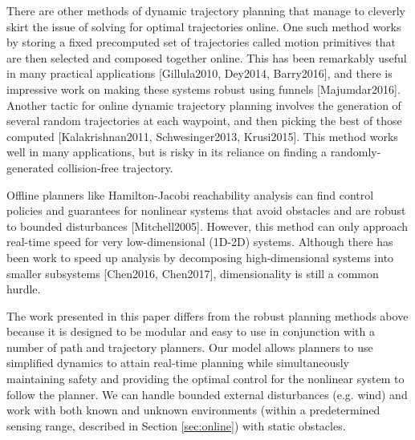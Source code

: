 There are other methods of dynamic trajectory planning that manage to cleverly skirt the issue of solving for optimal trajectories online.  One such method works by storing a fixed precomputed set of trajectories called motion primitives that are then selected and composed together online.  This has been remarkably useful in many practical applications [Gillula2010, Dey2014, Barry2016], and there is impressive work on making these systems robust using funnels [Majumdar2016].  Another tactic for online dynamic trajectory planning involves the generation of several random trajectories at each waypoint, and then picking the best of those computed [Kalakrishnan2011, Schwesinger2013, Krusi2015].  This method works well in many applications, but is risky in its reliance on finding a randomly-generated collision-free trajectory.  

Offline planners like Hamilton-Jacobi reachability analysis can find control policies and guarantees for nonlinear systems that avoid obstacles and are robust to bounded disturbances [Mitchell2005].  However, this method can only approach real-time speed for very low-dimensional (1D-2D) systems. Although there has been work to speed up analysis by decomposing high-dimensional systems into smaller subsystems [Chen2016, Chen2017], dimensionality is still a common hurdle.

The work presented in this paper differs from the robust planning methods above because it is designed to be modular and easy to use in conjunction with a number of path and trajectory planners.  Our model allows planners to use simplified dynamics to attain real-time planning while simultaneously maintaining safety and providing the optimal control for the nonlinear system to follow the planner. We can handle bounded external disturbances (e.g. wind) and work with both known and unknown environments (within a predetermined sensing range, described in Section \ref{sec:online}) with static obstacles. 